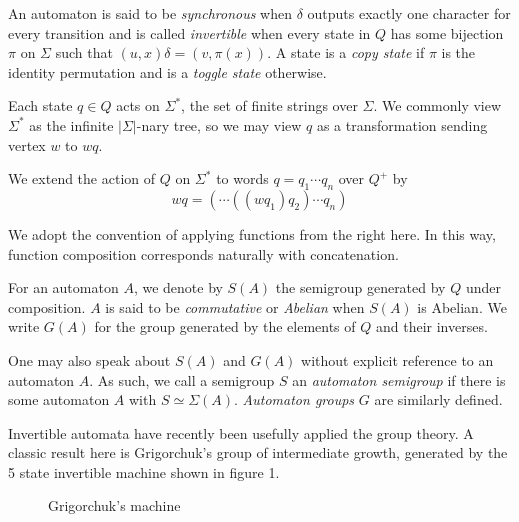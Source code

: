 \documentclass[10pt]{article} %
\newcommand{\defn}[1]{\textit{#1}}
\begin{document}
An automaton is said to be \defn{synchronous} when $\delta$ outputs exactly one character for every transition and is called \defn{invertible} when every state in $Q$ has some bijection $\pi$ on $\Sigma$ such that $(u, x)\delta = (v, \pi(x))$. A state is a \defn{copy state} if $\pi$ is the identity permutation and is a \defn{toggle state} otherwise.

Each state $q \in Q$ acts on $\Sigma^*$, the set of finite strings over $\Sigma$. We commonly view $\Sigma^*$ as the infinite $|\Sigma|$-nary tree, so we may view $q$ as a transformation sending vertex $w$ to $wq$.

We extend the action of $Q$ on $\Sigma^*$ to words $q = q_1\cdots q_n$ over $Q^+$ by \[ wq = (\cdots((w q_1) q_2)\cdots q_n) \]

We adopt the convention of applying functions from the right here. In this way, function composition corresponds naturally with concatenation.

For an automaton $A$, we denote by $S(A)$ the semigroup generated by $Q$ under composition. $A$ is said to be \defn{commutative} or \defn{Abelian} when $S(A)$ is Abelian. We write $G(A)$ for the group generated by the elements of $Q$ and their inverses.

One may also speak about $S(A)$ and $G(A)$ without explicit reference to an automaton $A$. As such, we call a semigroup $S$ an \defn{automaton semigroup} if there is some automaton $A$ with $S \simeq \Sigma(A)$. \defn{Automaton groups} $G$ are similarly defined.

Invertible automata have recently been usefully applied the group theory. A classic result here is Grigorchuk's group of intermediate growth, generated by the 5 state invertible machine shown in figure 1.

\begin{figure}
\begin{center}
\caption{Grigorchuk's machine}
\end{center}
\end{figure}
\end{document}
